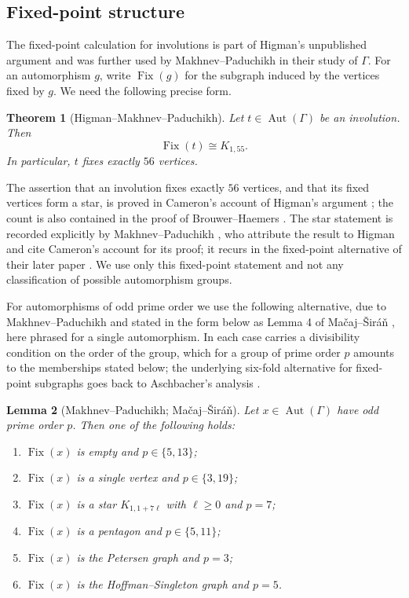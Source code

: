 \documentclass[11pt]{article}
\theoremstyle{plain}
\newtheorem{theorem}{Theorem}[section]
\newtheorem{lemma}[theorem]{Lemma}
\theoremstyle{remark}
\newcommand{\Aut}{\operatorname{Aut}}
\newcommand{\Fix}{\operatorname{Fix}}
\begin{document}
\subsection{Fixed-point structure}\label{subsec:fix}

The fixed-point calculation for involutions is part of Higman's unpublished argument and was further used by Makhnev--Paduchikh in their study of $\Gamma$.
For an automorphism $g$, write $\Fix(g)$ for the subgraph induced by the vertices fixed by $g$.
We need the following precise form.

\begin{theorem}[Higman--Makhnev--Paduchikh]\label{thm:higman}
Let $t\in\Aut(\Gamma)$ be an involution.  Then
\[
 \Fix(t)\cong K_{1,55}.
\]
In particular, $t$ fixes exactly $56$ vertices.
\end{theorem}

The assertion that an involution fixes exactly $56$ vertices, and that its fixed vertices form a star,
is proved in Cameron's account of Higman's argument \cite[proof of Theorem 3.13]{Cameron};
the count is also contained in the proof of Brouwer--Haemers \cite[Proposition 11.5.2]{BrouwerHaemers}.
The star statement is recorded explicitly by Makhnev--Paduchikh \cite[Lemma 4]{MakhnevPaduchikh},
who attribute the result to Higman and cite Cameron's account for its proof;
it recurs in the fixed-point alternative of their later paper \cite[Proposition 1]{MakhnevPaduchikh2009}.
We use only this fixed-point statement and not any classification of possible automorphism groups.

For automorphisms of odd prime order we use the following alternative,
due to Makhnev--Paduchikh \cite[Lemma 3]{MakhnevPaduchikh} and stated in the form below as Lemma 4 of Ma\v{c}aj--\v{S}ir\'a\v{n} \cite{MacajSiran},
here phrased for a single automorphism.
In \cite{MacajSiran} each case carries a divisibility condition on the order of the group,
which for a group of prime order $p$ amounts to the memberships stated below;
the underlying six-fold alternative for fixed-point subgraphs goes back to Aschbacher's analysis \cite{Aschbacher}.

\begin{lemma}[Makhnev--Paduchikh; Ma\v{c}aj--\v{S}ir\'a\v{n}]\label{lem:fix-odd}
Let $x\in\Aut(\Gamma)$ have odd prime order $p$.  Then one of the following holds:
\begin{enumerate}
\item[(1)] $\Fix(x)$ is empty and $p\in\{5,13\}$;
\item[(2)] $\Fix(x)$ is a single vertex and $p\in\{3,19\}$;
\item[(3)] $\Fix(x)$ is a star $K_{1,1+7\ell}$ with $\ell\ge 0$ and $p=7$;
\item[(4)] $\Fix(x)$ is a pentagon and $p\in\{5,11\}$;
\item[(5)] $\Fix(x)$ is the Petersen graph and $p=3$;
\item[(6)] $\Fix(x)$ is the Hoffman--Singleton graph and $p=5$.
\end{enumerate}
\end{lemma}
\end{document}
